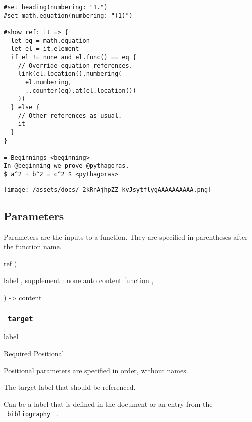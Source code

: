 \begin{verbatim}
#set heading(numbering: "1.")
#set math.equation(numbering: "(1)")

#show ref: it => {
  let eq = math.equation
  let el = it.element
  if el != none and el.func() == eq {
    // Override equation references.
    link(el.location(),numbering(
      el.numbering,
      ..counter(eq).at(el.location())
    ))
  } else {
    // Other references as usual.
    it
  }
}

= Beginnings <beginning>
In @beginning we prove @pythagoras.
$ a^2 + b^2 = c^2 $ <pythagoras>
\end{verbatim}

\texttt{[image: /assets/docs/\_2kRnAjhpZZ-kvJsytflygAAAAAAAAAA.png]}

\subsection{\texorpdfstring{{ Parameters
}}{ Parameters }}\label{parameters}

\label{parameters-tooltip}
Parameters are the inputs to a function. They are specified in
parentheses after the function name.

{ ref } (

{ \href{/docs/reference/foundations/label/}{label} , } {
\hyperref[parameters-supplement]{supplement :}
\href{/docs/reference/foundations/none/}{none}
\href{/docs/reference/foundations/auto/}{auto}
\href{/docs/reference/foundations/content/}{content}
\href{/docs/reference/foundations/function/}{function} , }

) -\textgreater{} \href{/docs/reference/foundations/content/}{content}

\subsubsection{\texorpdfstring{\texttt{\ target\ }}{ target }}\label{parameters-target}

\href{/docs/reference/foundations/label/}{label}

{Required} {{ Positional }}

\label{parameters-target-positional-tooltip}
Positional parameters are specified in order, without names.

The target label that should be referenced.

Can be a label that is defined in the document or an entry from the
\href{/docs/reference/model/bibliography/}{\texttt{\ bibliography\ }} .

